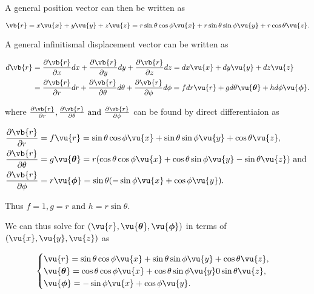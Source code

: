 \documentclass[english,a4paper,12pt]{report}
\begin{document}
A general position vector can then be written as 

\begin{equation}
    \vb{r} = x \vu{x} + y \vu{y} + z \vu{z} = r\sin \theta \cos \phi \vu{x} + r\sin \theta \sin \phi \vu{y} + r \cos \theta \vu{z} .
\end{equation}

A general infinitismal displacement vector can be written as 

\begin{equation}
    \begin{aligned}
    d \vb{r} &= \frac{\partial \vb{r} }{\partial x} dx + \frac{\partial \vb{r} }{\partial y} dy + \frac{\partial \vb{r} }{\partial z} dz = dx \vu{x} + dy \vu{y} + dz \vu{z} \\ &= \frac{\partial \vb{r} }{\partial r} dr + \frac{\partial \vb{r} }{\partial \theta }d\theta + \frac{\partial \vb{r} }{\partial \phi }d \phi =f dr \vu{r} +g d\theta \vu{\boldsymbol{\theta } } +h  d \phi \vu{\boldsymbol{\phi } }. 
    \end{aligned}
\end{equation}

where \(\frac{\partial \vb{r} }{\partial r}, \frac{\partial \vb{r} }{\partial \theta } \text { and } \frac{\partial \vb{r} }{\partial \phi } \) can be found by direct differentiaion as 

\begin{equation}
	\begin{aligned} 
		\frac{\partial \vb{r} }{\partial r}   &= f \vu{r} = \sin{\theta}\cos{\phi}\vu{x} + \sin{\theta}\sin{\phi}\vu{y} + \cos{\theta}\vu{z}, \\
		\frac{\partial \vb{r} }{\partial \theta }  &= g \vu{\boldsymbol{\theta }} = r(\cos{\theta}\cos{\phi}\vu{x} + \cos{\theta}\sin{\phi}\vu{y} - \sin{\theta}\vu{z})\text { and }  \\
		\frac{\partial \vb{r} }{\partial \phi }  &= r \vu{\boldsymbol{\phi } } = \sin \theta (-\sin{\phi}\vu{x} + \cos{\phi}\vu{y}). 
	\end{aligned} 
\end{equation}

Thus \(f = 1, g = r \text { and }  h = r\sin \theta \).

We can thus solve for \((\vu{r} , \vu{\boldsymbol{\theta } }, \vu{\boldsymbol{\phi } })\) in terms of \((\vu{x}, \vu{y} ,\vu{z} )\) as 

\begin{equation}
    \begin{cases}
        \vu{r} = \sin \theta \cos \phi  \vu{x}  + \sin \theta \sin \phi  \vu{y}  + \cos \theta  \vu{z},  \\
        \vu{\boldsymbol{\theta } } = \cos \theta \cos \phi \vu{x}  + \cos \theta \sin \phi \vu{y} 0 \sin \theta \vu{z}, \\
        \vu{\boldsymbol{\phi } } = -\sin \phi  \vu{x} + \cos \phi \vu{y}. 
    \end{cases}
\end{equation}
\end{document}
